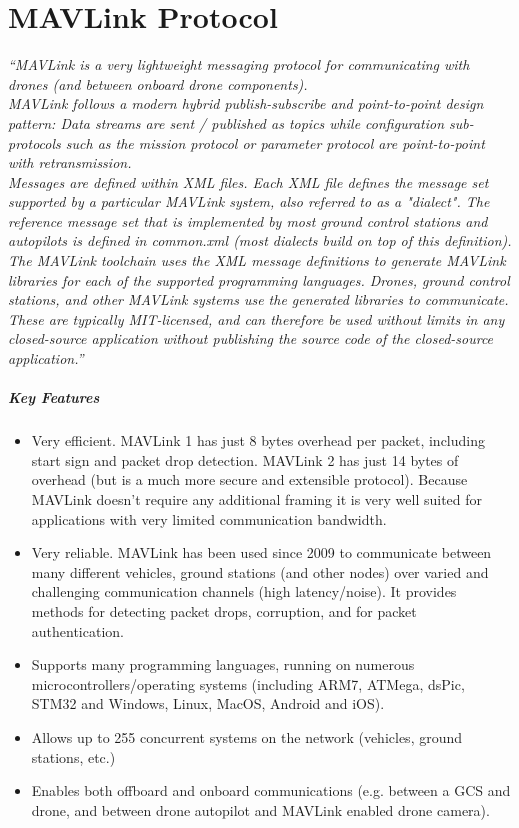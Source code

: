 
\chapter{MAVLink Protocol} %
\label{appendix:mavlink}
\textit{“MAVLink is a very lightweight messaging protocol for communicating with drones (and between onboard drone components).\\
MAVLink follows a modern hybrid publish-subscribe and point-to-point design pattern: Data streams are sent / published as topics while configuration sub-protocols such as the mission protocol or parameter protocol are point-to-point with retransmission.\\
Messages are defined within XML files. Each XML file defines the message set supported by a particular MAVLink system, also referred to as a "dialect". The reference message set that is implemented by most ground control stations and autopilots is defined in common.xml (most dialects build on top of this definition).\\
The MAVLink toolchain uses the XML message definitions to generate MAVLink libraries for each of the supported programming languages. Drones, ground control stations, and other MAVLink systems use the generated libraries to communicate. These are typically MIT-licensed, and can therefore be used without limits in any closed-source application without publishing the source code of the closed-source application.”} \cite{Mavlink}
\paragraph{Key Features} %
\label{par:key_features}
\begin{itemize}
	\item Very efficient. MAVLink 1 has just 8 bytes overhead per packet, including start sign and packet drop detection. MAVLink 2 has just 14 bytes of overhead (but is a much more secure and extensible protocol). Because MAVLink doesn't require any additional framing it is very well suited for applications with very limited communication bandwidth. 
	\item Very reliable. MAVLink has been used since 2009 to communicate between many different vehicles, ground stations (and other nodes) over varied and challenging communication channels (high latency/noise). It provides methods for detecting packet drops, corruption, and for packet authentication.
	\item Supports many programming languages, running on numerous microcontrollers/operating systems (including ARM7, ATMega, dsPic, STM32 and Windows, Linux, MacOS, Android and iOS).
	\item Allows up to 255 concurrent systems on the network (vehicles, ground stations, etc.)
	\item Enables both offboard and onboard communications (e.g. between a GCS and drone, and between drone autopilot and MAVLink enabled drone camera). 
\end{itemize}



